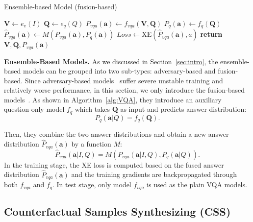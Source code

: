 \documentclass[10pt,twocolumn,letterpaper]{article}
\begin{document}
\begin{algorithm}[t]
	\caption{Ensemble-based Model (fusion-based)}\label{alg:VQA}
	\begin{algorithmic}[1]
		\State $ \bm{V} \leftarrow e_v(I) $
		\State $ \bm{Q} \leftarrow e_q(Q) $
		\State $ P_{vqa}(\bm{a}) \leftarrow f_{vqa}(\bm{V}, \bm{Q}) $
		\State $ P_{q}(\bm{a}) \leftarrow f_{q}(\bm{Q})$      
		\State $ \hat{P}_{vqa}(\bm{a}) \leftarrow M(P_{vqa}(\bm{a}), P_{q}(\bm{a}))  $
		\State $ Loss \leftarrow \text{XE}(\hat{P}_{vqa}(\bm{a}), a)$ 
		\State \textbf{return} $\bm{V}, \bm{Q}, P_{vqa}(\bm{a})$
		\EndIf 
		\EndFunction
	\end{algorithmic}
\end{algorithm}


\noindent\textbf{Ensemble-Based Models.} As we discussed in Section~\ref{sec:intro}, the ensemble-based models can be grouped into two sub-types: adversary-based and fusion-based. Since adversary-based models~\cite{ramakrishnan2018overcoming, grand2019adversarial, belinkov2019don} suffer severe unstable training and relatively worse performance, in this section, we only introduce the fusion-based models~\cite{cadene2019rubi, clark2019don, mahabadi2019simple}. As shown in Algorithm~\ref{alg:VQA}, they introduce an auxiliary question-only model $f_q$ which takes $\bm{Q}$ as input and predicts answer distribution:
\begin{equation}
P_{q}(\bm{a}|Q) = f_{q}(\bm{Q}).
\end{equation}

Then, they combine the two answer distributions and obtain a new answer distribution $\hat{P}_{vqa}(\bm{a})$ by a function $M$:
\begin{equation}
\hat{P}_{vqa}(\bm{a}|I, Q) = M(P_{vqa}(\bm{a}|I, Q), P_{q}(\bm{a}|Q)).
\end{equation}
In the training stage, the XE loss is computed based on the fused answer distribution $\hat{P}_{vqa}(\bm{a})$ and the training gradients are backpropagated through both $f_{vqa}$ and $f_q$. In test stage, only model $f_{vqa}$ is used as the plain VQA models.


\subsection{Counterfactual Samples Synthesizing (CSS)} \label{sec:3.2}
\end{document}
